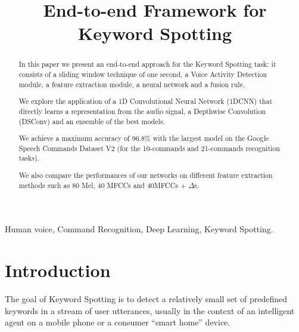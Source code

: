 \documentclass[conference]{IEEEtran}
\begin{document}
\title{End-to-end Framework for Keyword Spotting}
\author{
\and
{}
}

\maketitle

\begin{abstract}
In this paper we present an end-to-end approach for the Keyword Spotting task: it consists of a sliding window technique of one second, a Voice Activity Detection module, a feature extraction module, a neural network and a fusion rule.

We explore the application of a 1D Convolutional Neural Network (1DCNN) that directly learns a representation from the audio signal, a Depthwise Convolution (DSConv) and an ensemble of the best models.

We achieve a maximum accuracy of 96.8\% with the largest model on the Google Speech Commands Dataset V2 (for the 10-commands and 21-commands recognition tasks).

We also compare the performances of our networks on different feature extraction methods such as 80 Mel, 40 MFCCs and 40MFCCs + $\Delta$s.
\end{abstract}

\IEEEpeerreviewmaketitle
\begin{IEEEkeywords}
Human voice, Command Recognition, Deep Learning, Keyword Spotting.
\end{IEEEkeywords}

\section{Introduction}
The goal of Keyword Spotting is to detect a relatively small set of predefined keywords in a stream of user utterances, usually in the context of an intelligent agent on a mobile phone or a consumer “smart home” device.
\end{document}
